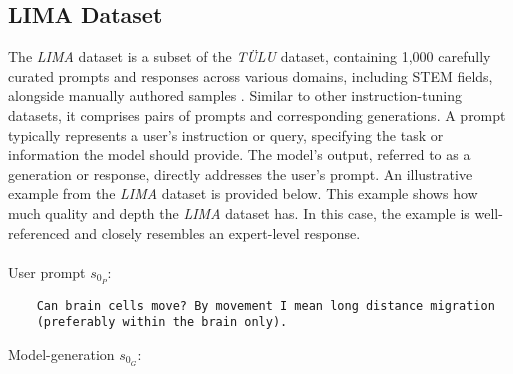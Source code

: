 
\subsection{LIMA Dataset}\label{subsec:lima_dataset}
The \emph{LIMA} dataset is a subset of the \emph{TÜLU} dataset, containing 1,000 carefully curated prompts and responses across various domains, including STEM fields, alongside manually authored samples \cite{zhou2023limaalignment}. Similar to other instruction-tuning datasets, it comprises pairs of prompts and corresponding generations. A prompt typically represents a user's instruction or query, specifying the task or information the model should provide. The model's output, referred to as a generation or response, directly addresses the user's prompt. An illustrative example from the \emph{LIMA} dataset is provided below. This example shows how much quality and depth the \emph{LIMA} dataset has. In this case, the example is well-referenced and closely resembles an expert-level response.
\\\\
User prompt $s_{0_P}$:
\begin{verbatim}
    Can brain cells move? By movement I mean long distance migration 
    (preferably within the brain only).
\end{verbatim}
Model-generation $s_{0_G}$:
